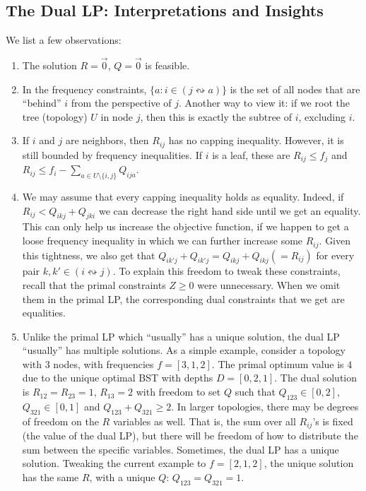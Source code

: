\subsection{The Dual LP: Interpretations and Insights}
\label{subsection_interpreting_the_dual_LP}

We list a few observations:
\begin{enumerate}
    
    \item The solution $R = \vec{0}$, $Q = \vec{0}$ is feasible.

    \item \label{dual_rooting} In the frequency constraints, $\{ a : i \in (j \leftrightsquigarrow a) \}$ is the set of all nodes that are ``behind'' $i$ from the perspective of $j$. Another way to view it: if we root the tree (topology) $U$ in node $j$, then this is exactly the subtree of $i$, excluding $i$.

    \item If $i$ and $j$ are neighbors, then $R_{ij}$ has no capping inequality. However, it is still bounded by frequency inequalities. If $i$ is a leaf, these are $R_{ij} \le f_j$ and $R_{ij} \le f_i - \sum_{a \in U \setminus \{i,j\}}{Q_{ija}}$.

    \item We may assume that every capping inequality holds as equality. Indeed, if $R_{ij} < Q_{ikj} + Q_{jki}$ we can decrease the right hand side until we get an equality. This can only help us increase the objective function, if we happen to get a loose frequency inequality in which we can further increase some $R_{ij}$. Given this tightness, we also get that $Q_{ik'j}+Q_{ik'j} = Q_{ikj}+Q_{ikj} (= R_{ij})$ for every pair $k,k' \in (i \leftrightsquigarrow j)$. To explain this freedom to tweak these constraints, recall that the primal constraints $Z \ge 0$ were unnecessary. When we omit them in the primal LP, the corresponding dual constraints that we get are equalities.

    \item Unlike the primal LP which ``usually'' has a unique solution, the dual LP ``usually'' has multiple solutions. As a simple example, consider a topology with $3$ nodes, with frequencies $f = [3,1,2]$. The primal optimum value is $4$ due to the unique optimal BST with depths $D = [0,2,1]$. The dual solution is $R_{12} = R_{23} = 1$, $R_{13} = 2$ with freedom to set $Q$ such that $Q_{123} \in [0,2]$, $Q_{321} \in [0,1]$ and $Q_{123}+Q_{321} \ge 2$. In larger topologies, there may be degrees of freedom on the $R$ variables as well. That is, the sum over all $R_{ij}$'s is fixed (the value of the dual LP), but there will be freedom of how to distribute the sum between the specific variables. Sometimes, the dual LP has a unique solution. Tweaking the current example to $f=[2,1,2]$, the unique solution has the same $R$, with a unique $Q$: $Q_{123}=Q_{321}=1$.


\end{enumerate}
